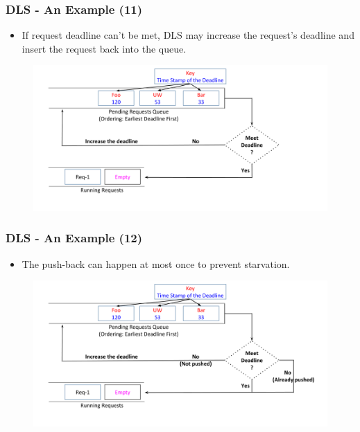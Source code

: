 \documentclass{beamer}
\begin{document}
\begin{frame}
  \frametitle{DLS - An Example (11)}
  \begin{itemize}
  \item If request deadline can't be met, DLS may increase the request's
    deadline and insert the request back into the queue.
    \newline
  \end{itemize}
  \begin{figure}
    \begin{center}
      \centerline{\includegraphics[scale=0.33]{img/DLS_Example8_5.png}}
    \end{center}
  \end{figure}
\end{frame}


\begin{frame}
  \frametitle{DLS - An Example (12)}
  \begin{itemize}
  \item The push-back can happen at most once to prevent starvation.
    \newline
    \newline
  \end{itemize}
  \begin{figure}
    \begin{center}
      \centerline{\includegraphics[scale=0.33]{img/DLS_Example8_6.png}}
    \end{center}
  \end{figure}
\end{frame}
\end{document}
